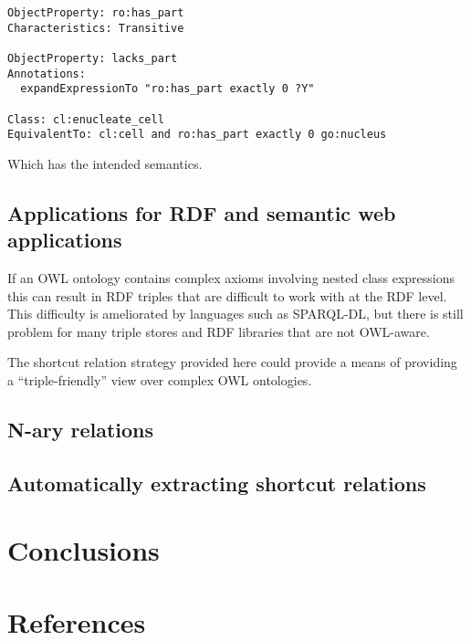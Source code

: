 \documentclass[11pt]{article}
\begin{document}
\begin{verbatim}
ObjectProperty: ro:has_part
Characteristics: Transitive

ObjectProperty: lacks_part
Annotations:
  expandExpressionTo "ro:has_part exactly 0 ?Y"

Class: cl:enucleate_cell
EquivalentTo: cl:cell and ro:has_part exactly 0 go:nucleus
\end{verbatim}

Which has the intended semantics.

\subsection{Applications for RDF and semantic web applications}

If an OWL ontology contains complex axioms involving nested class
expressions this can result in RDF triples that are difficult to work
with at the RDF level. This difficulty is ameliorated by languages
such as SPARQL-DL, but there is still problem for many triple stores
and RDF libraries that are not OWL-aware.

The shortcut relation strategy provided here could provide a means of
providing a ``triple-friendly'' view over complex OWL ontologies.

\subsection{N-ary relations}


\subsection{Automatically extracting shortcut relations}


\section{Conclusions}

\section{References}



\end{document}
